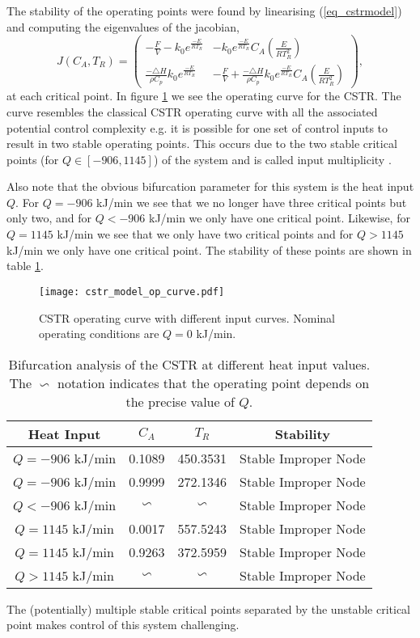 The stability of the operating points were found by linearising (\ref{eq_cstrmodel}) and computing the eigenvalues of the jacobian,
\begin{equation}
J(C_A, T_R) = \begin{pmatrix}
-\frac{F}{V} - k_0e^{\frac{-E}{RT_R}} & - k_0e^{\frac{-E}{RT_R}}C_A\left(\frac{E}{RT_R^2}\right) \\
\frac{-\triangle H}{\rho C_p}k_0e^{\frac{-E}{RT_R}} & -\frac{F}{V} + \frac{-\triangle H}{\rho C_p}k_0e^{\frac{-E}{RT_R}}C_A\left(\frac{E}{RT_R^2}\right)
\end{pmatrix},
\label{eq_jacobian}
\end{equation}
at each critical point. In figure \ref{fig_cstr_op_curve} we see the operating curve for the CSTR. The curve resembles the classical CSTR operating curve with all the associated potential control complexity e.g. it is possible for one set of control inputs to result in two stable operating points. This occurs due to the two stable critical points (for $Q\in [-906, 1145]$) of the system and is called input multiplicity \cite{luyben}. 

Also note that the obvious bifurcation parameter for this system is the heat input $Q$. For $Q = -906$ kJ/min we see that we no longer have three critical points but only two, and for $Q < -906$ kJ/min we only have one critical point. Likewise, for $Q = 1145$ kJ/min we see that we only have two critical points and for $Q > 1145$ kJ/min we only have one critical point. The stability of these points are shown in table \ref{tab_bifurc}.  
\begin{figure}[H] 
\centering
\texttt{[image: cstr\_model\_op\_curve.pdf]}
\caption{CSTR operating curve with different input curves. Nominal operating conditions are $Q=0$ kJ/min.}
\label{fig_cstr_op_curve}
\end{figure}
\begin{table}[H]
\begin{center}
\begin{tabular}{c c c c}
\hline
Heat Input & $C_A$ & $T_R$ & Stability\\
\hline
$Q = -906$ kJ/min & 0.1089 & 450.3531 & Stable Improper Node\\
$Q = -906$ kJ/min & 0.9999 & 272.1346 & Stable Improper Node \\
\hline
$Q < -906$ kJ/min & $\backsim$ & $\backsim$ & Stable Improper Node \\
\hline
$Q = 1145$ kJ/min & 0.0017 & 557.5243 & Stable Improper Node\\
$Q = 1145$ kJ/min & 0.9263 & 372.5959 & Stable Improper Node \\
\hline
$Q > 1145$ kJ/min & $\backsim$ & $\backsim$ & Stable Improper Node \\
\hline
\end{tabular}
\caption{Bifurcation analysis of the CSTR at different heat input values. The $\backsim$ notation indicates that the operating point depends on the precise value of $Q$.}
\label{tab_bifurc}
\end{center}
\end{table}
The (potentially) multiple stable critical points separated by the unstable critical point makes control of this system challenging.    

